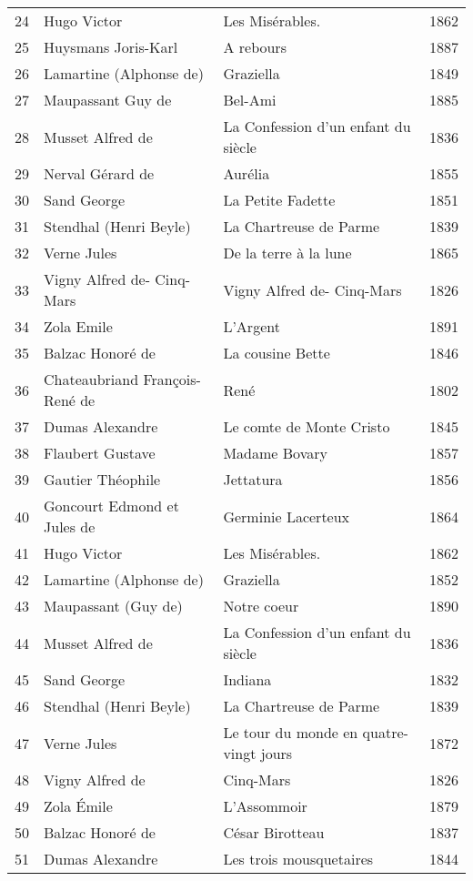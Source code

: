 \begin{center}
\begin{small}
\begin{longtable}{l l l l}
  24 & Hugo Victor & Les Misérables. & 1862 \\
  25 & Huysmans Joris-Karl & A rebours & 1887 \\
  26 & Lamartine (Alphonse de) & Graziella & 1849 \\
  27 & Maupassant Guy de & Bel-Ami & 1885 \\
  28 & Musset Alfred de & La Confession d’un enfant du siècle & 1836 \\
  29 & Nerval Gérard de & Aurélia & 1855 \\
  30 & Sand George & La Petite Fadette & 1851 \\
  31 & Stendhal (Henri Beyle) & La Chartreuse de Parme & 1839 \\
  32 & Verne Jules & De la terre à la lune & 1865 \\
  33 & Vigny Alfred de- Cinq-Mars & Vigny Alfred de- Cinq-Mars & 1826 \\
  34 & Zola Emile & L'Argent & 1891 \\
  35 & Balzac Honoré de & La cousine Bette & 1846 \\
  36 & Chateaubriand François-René de & René & 1802 \\
  37 & Dumas Alexandre & Le comte de Monte Cristo & 1845 \\
  38 & Flaubert Gustave & Madame Bovary & 1857 \\
  39 & Gautier Théophile & Jettatura & 1856 \\
  40 & Goncourt Edmond et Jules de & Germinie Lacerteux & 1864 \\
  41 & Hugo Victor & Les Misérables. & 1862 \\
  42 & Lamartine (Alphonse de) & Graziella & 1852 \\
  43 & Maupassant (Guy de) & Notre coeur & 1890 \\
  44 & Musset Alfred de & La Confession d’un enfant du siècle & 1836 \\
  45 & Sand George & Indiana & 1832 \\
  46 & Stendhal (Henri Beyle) & La Chartreuse de Parme & 1839 \\
  47 & Verne Jules & Le tour du monde en quatre-vingt jours & 1872 \\
  48 & Vigny Alfred de & Cinq-Mars & 1826 \\
  49 & Zola Émile & L’Assommoir & 1879 \\
  50 & Balzac Honoré de & César Birotteau & 1837 \\
  51 & Dumas Alexandre & Les trois mousquetaires & 1844 \\

\end{longtable}
\end{small}
\end{center}
